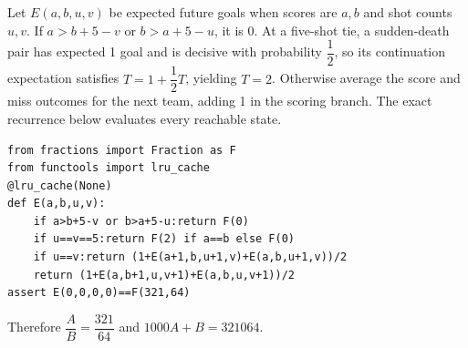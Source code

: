 Let $E(a,b,u,v)$ be expected future goals when scores are $a,b$ and shot counts $u,v$. If $a>b+5-v$ or $b>a+5-u$, it is 0. At a five-shot tie, a sudden-death pair has expected 1 goal and is decisive with probability $\dfrac{1}{2}$, so its continuation expectation satisfies $T=1+\dfrac{1}{2}T$, yielding $T=2$. Otherwise average the score and miss outcomes for the next team, adding 1 in the scoring branch. The exact recurrence below evaluates every reachable state.
\begin{verbatim}
from fractions import Fraction as F
from functools import lru_cache
@lru_cache(None)
def E(a,b,u,v):
    if a>b+5-v or b>a+5-u:return F(0)
    if u==v==5:return F(2) if a==b else F(0)
    if u==v:return (1+E(a+1,b,u+1,v)+E(a,b,u+1,v))/2
    return (1+E(a,b+1,u,v+1)+E(a,b,u,v+1))/2
assert E(0,0,0,0)==F(321,64)
\end{verbatim}
Therefore $\dfrac{A}{B}=\dfrac{321}{64}$ and $\boxed{1000A+B=321064}$.
